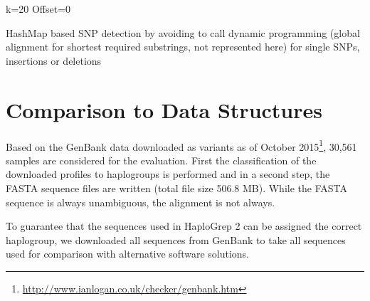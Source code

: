 \begin{algorithm}

 k=20\; 
Offset=0\;
\caption{HashMap based SNP detection by avoiding to call dynamic programming (global alignment for shortest required substrings, not represented here) for single SNPs, insertions or deletions  }
\label{alg:align2}
\end{algorithm}

\section{Comparison to Data Structures}
Based on the GenBank data downloaded as variants as of October 2015\footnote{\url{http://www.ianlogan.co.uk/checker/genbank.htm}},  30,561 samples are considered for the evaluation. First the classification of the downloaded profiles to haplogroups is performed and in a second step, the FASTA sequence files are written (total file size 506.8 MB). While the FASTA sequence is always unambiguous, the alignment is not always. 

To guarantee that the sequences used in HaploGrep 2 can be assigned the correct haplogroup, we downloaded all sequences from GenBank to take all sequences used for comparison with alternative software solutions.

